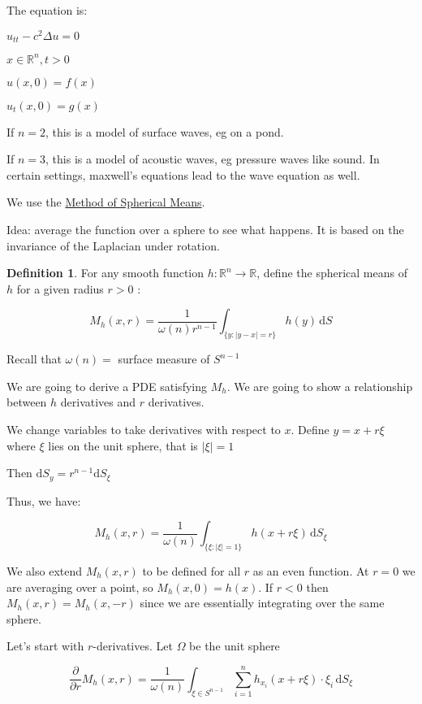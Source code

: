 \documentclass{article}
\theoremstyle{definition}
\newtheorem{definition}{Definition}
\begin{document}
The equation is:

\(u_{t t} - c^2 \Delta u = 0\) 

\(x\in\mathbb{R}^n, t > 0\) 

\(u(x,0) = f(x)\) 

\(u_t(x,0) = g(x)\) 

If \(n = 2\), this is a model of surface waves, eg on a pond.

If \(n = 3\), this is a model of acoustic waves, eg pressure waves like sound. In certain settings, maxwell's equations lead to the wave equation as well.

We use the \underline{Method of Spherical Means}.

Idea: average the function over a sphere to see what happens. It is based on the invariance of the Laplacian under rotation.

\begin{definition}
    For any smooth function \(h:\mathbb{R}^n \to \mathbb{R}\), define the spherical means of \(h\) for a given radius \(r > 0\) :

    \[
        M_h(x,r) = \frac{1}{\omega(n)r^{n - 1}} \int_{\{ y : \vert y - x \vert = r \} }^{} h(y) \,\mathrm{d}S 
    \]

    Recall that \(\omega(n) = \) surface measure of \(S^{n-1}\) 
\end{definition}

We are going to derive a PDE satisfying \(M_h\). We are going to show a relationship between \(h\) derivatives and \(r\) derivatives.

We change variables to take derivatives with respect to \(x\). Define \(y = x + r \xi\) where \(\xi\) lies on the unit sphere, that is \(\vert \xi \vert = 1\)

Then \(\mathrm{d} S_y = r^{n-1}\mathrm{d} S_\xi\) 

Thus, we have:

\[
    M_h(x,r) = \frac{1}{\omega(n)} \int_{\{ \xi : \vert \xi \vert = 1 \}}^{} h(x+r\xi) \,\mathrm{d}S_\xi 
\]

We also extend \(M_h(x,r)\) to be defined for all \(r\) as an even function. At \(r = 0\) we are averaging over a point, so \(M_h(x,0)=h(x)\). If \(r < 0\) then \(M_h(x,r) = M_h(x,-r)\) since we are essentially integrating over the same sphere.

Let's start with \(r\)-derivatives. Let \(\Omega\) be the unit sphere

\[
    \frac{\partial}{\partial r} M_h(x,r) = \frac{1}{\omega (n)}\int_{\xi\in S^{n-1}}^{} \sum_{i=1}^{n} h_{x_i} (x+r\xi)\cdot\xi_i \,\mathrm{d}S_\xi 
\]
\end{document}
